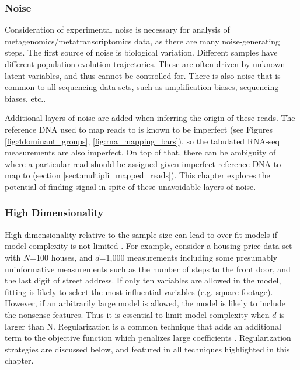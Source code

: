\subsubsection{Noise}
Consideration of experimental noise is necessary for analysis of metagenomics/metatranscriptomics data, as there are many noise-generating steps.
The first source of noise is biological variation.
Different samples have different population evolution trajectories.
These are often driven by unknown latent variables, and thus cannot be controlled for.
There is also noise that is common to all sequencing data sets, such as amplification biases, sequencing biases, etc..

Additional layers of noise are added when inferring the origin of these reads.
The reference DNA used to map reads to is known to be imperfect (see Figures \ref{fig:4dominant_groups}, \ref{fig:rna_mapping_bars}), so the tabulated RNA-seq measurements are also imperfect. %
On top of that, there can be ambiguity of where a particular read should be assigned given imperfect reference DNA to map to (section \ref{sect:multipli_mapped_reads}).
This chapter explores the potential of finding signal in spite of these unavoidable layers of noise.

\subsubsection{High Dimensionality}
High dimensionality relative to the sample size can lead to over-fit models if model complexity is not limited \cite{friedman2001}. %
For example, consider a housing price data set with $N$=100 houses, and $d$=1,000 measurements including some presumably uninformative measurements such as the number of steps to the front door, and the last digit of street address.
If only ten variables are allowed in the model, fitting is likely to select the most influential variables (e.g. square footage).
However, if an arbitrarily large model is allowed, the model is likely to include the nonsense features.
Thus it is essential to limit model complexity when $d$ is larger than N.
Regularization is a common technique that adds an additional term to the objective function which penalizes large coefficients \cite{friedman2001}.
Regularization strategies are discussed below, and featured in all techniques highlighted in this chapter.

